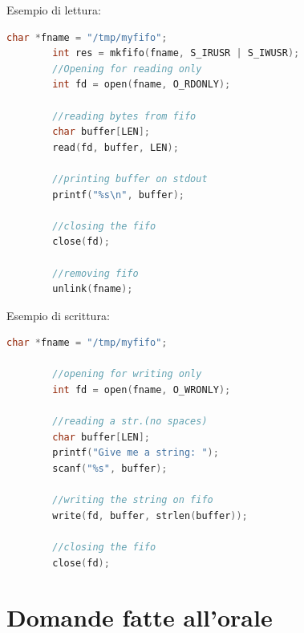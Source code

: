 \documentclass[a4paper, 12pt]{book}
\begin{document}
    Esempio di lettura:
    \begin{lstlisting}[language=C]
        char *fname = "/tmp/myfifo";
        int res = mkfifo(fname, S_IRUSR | S_IWUSR);
        //Opening for reading only 
        int fd = open(fname, O_RDONLY);

        //reading bytes from fifo 
        char buffer[LEN];
        read(fd, buffer, LEN);

        //printing buffer on stdout 
        printf("%s\n", buffer);

        //closing the fifo 
        close(fd);

        //removing fifo 
        unlink(fname);
    \end{lstlisting}
    Esempio di scrittura:
    \begin{lstlisting}[language=C]
        char *fname = "/tmp/myfifo";

        //opening for writing only 
        int fd = open(fname, O_WRONLY);

        //reading a str.(no spaces)
        char buffer[LEN];
        printf("Give me a string: ");
        scanf("%s", buffer);

        //writing the string on fifo 
        write(fd, buffer, strlen(buffer));

        //closing the fifo
        close(fd);
    \end{lstlisting}
    








    



    
    







    


     

    \chapter{Domande fatte all'orale}
\end{document}
